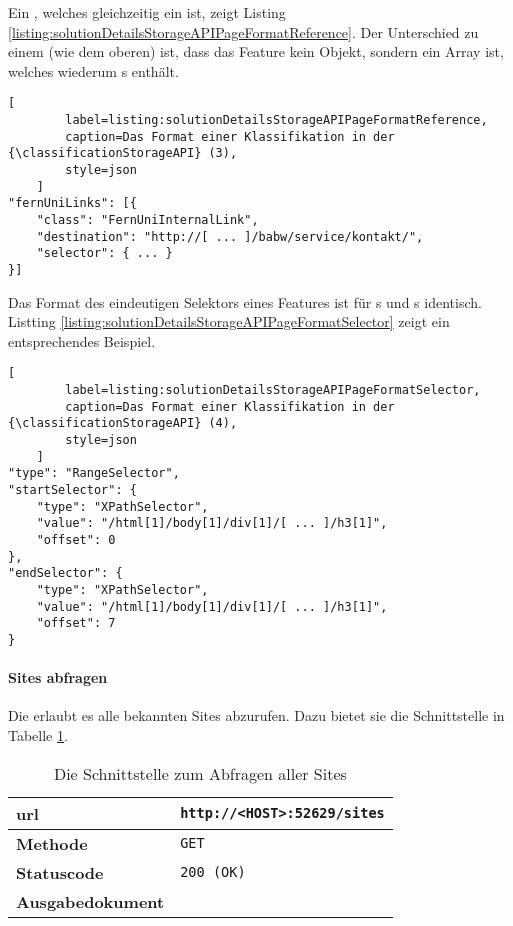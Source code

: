     Ein {}, welches gleichzeitig ein {\collectionFeature} ist,
    zeigt Listing \ref{listing:solutionDetailsStorageAPIPageFormatReference}.
    Der Unterschied zu einem {\scalarFeature} (wie dem oberen) ist,
    dass das Feature kein Objekt, sondern ein Array ist,
    welches wiederum {\scalarFeature}s enthält.

    \begin{lstlisting}[
        label=listing:solutionDetailsStorageAPIPageFormatReference,
        caption=Das Format einer Klassifikation in der {\classificationStorageAPI} (3),
        style=json
    ]
"fernUniLinks": [{
    "class": "FernUniInternalLink",
    "destination": "http://[ ... ]/babw/service/kontakt/",
    "selector": { ... }
}]
    \end{lstlisting}

    Das Format des eindeutigen Selektors eines Features ist für {\contentFeature}s
    und {}s identisch.
    Listting \ref{listing:solutionDetailsStorageAPIPageFormatSelector} zeigt ein entsprechendes Beispiel.

    \begin{lstlisting}[
        label=listing:solutionDetailsStorageAPIPageFormatSelector,
        caption=Das Format einer Klassifikation in der {\classificationStorageAPI} (4),
        style=json
    ]
"type": "RangeSelector",
"startSelector": {
    "type": "XPathSelector",
    "value": "/html[1]/body[1]/div[1]/[ ... ]/h3[1]",
    "offset": 0
},
"endSelector": {
    "type": "XPathSelector",
    "value": "/html[1]/body[1]/div[1]/[ ... ]/h3[1]",
    "offset": 7
}
    \end{lstlisting}

    \paragraph*{Sites abfragen}
    Die {\classificationStorageAPI} erlaubt es alle bekannten Sites abzurufen.
    Dazu bietet sie die Schnittstelle in Tabelle \ref{table:getSitesInterface}.

    \begin{table}[htb]
        \centering
        \begin{tabular}{|l|l|}
        \hline
        \textbf{\gls{url}} & \texttt{http://<HOST>:52629/sites}\\
        \hline
        \textbf{Methode} & \texttt{GET}\\
        \hline
        \textbf{Statuscode} & \texttt{200 (OK)}\\
        \hline
        \textbf{Ausgabedokument} & \\
        \hline
        \end{tabular}
        \caption{Die Schnittstelle zum Abfragen aller Sites}
        \label{table:getSitesInterface}
    \end{table}

